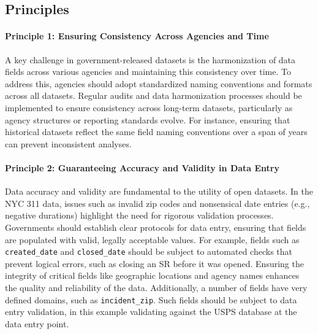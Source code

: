 \documentclass[linenumber]{jdsart}
\begin{document}
\subsection{Principles}
\paragraph{Principle 1: Ensuring Consistency Across Agencies and Time}
A key challenge in government-released datasets is the 
harmonization of data fields across various agencies and 
maintaining this consistency over time. To address this, agencies should adopt 
standardized naming conventions and formats across all datasets. 
Regular audits and data harmonization processes should be 
implemented to ensure consistency across long-term datasets, 
particularly as agency structures or reporting standards evolve. 
For instance, ensuring that historical datasets reflect the same 
field naming conventions over a span of years can prevent 
inconsistent analyses.

\paragraph{Principle 2: Guaranteeing Accuracy and Validity in Data Entry}
Data accuracy and validity are fundamental to the utility of 
open datasets. In the NYC 311 data, issues such as 
invalid zip codes and 
nonsensical date entries (e.g., negative durations) highlight the need 
for rigorous validation processes. Governments should establish 
clear protocols for data entry, ensuring that fields are populated with 
valid, legally acceptable values. For example, fields such as 
\texttt{created\_date} and \texttt{closed\_date} should be subject to 
automated checks that prevent logical errors, such as closing an 
SR before it was opened. Ensuring the integrity of critical fields 
like geographic locations and agency names enhances the quality 
and reliability of the data. Additionally, a number of fields have 
very defined domains, such as \texttt{incident\_zip}. Such fields
should be subject to data entry validation, in this example
validating against the USPS database at the data entry point.
\end{document}
